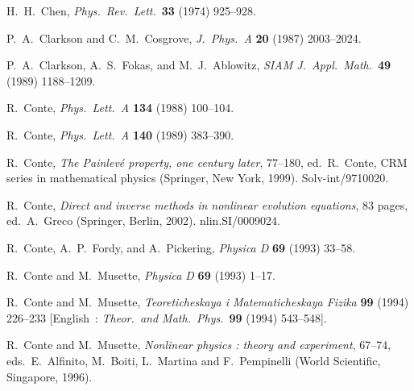 \documentclass[10pt]{article}
\begin{document}
\begin{thebibliography}{99}
 H.~H.~Chen,
{\it Phys.~Rev.~Lett.}~{\bf 33} (1974) 925--928.

 P.~A.~Clarkson and C.~M.~Cosgrove,
{\it J.~Phys.~A} {\bf 20} (1987) 2003--2024.

 P.~A.~Clarkson, A.~S.~Fokas, and M.~J.~Ablowitz,
{\it SIAM J.~Appl.~Math.}~{\bf 49} (1989) 1188--1209.

 R.~Conte,
{\it Phys.~Lett.~A} {\bf 134} (1988) 100--104.

 R.~Conte,
{\it Phys.~Lett.~A} {\bf 140} (1989) 383--390.

 R.~Conte,
{\it The Painlev\'e property, one century later},
77--180,
ed.~R.~Conte,
CRM series in mathematical physics (Springer, New York, 1999).
Solv-int/9710020.

 R.~Conte,
\textit{Direct and inverse methods in nonlinear evolution equations},
83 pages,
ed.~A.~Greco (Springer, Berlin, 2002).
nlin.SI/0009024.

 R.~Conte, A.~P.~Fordy, and A.~Pickering,
{\it Physica D} {\bf 69} (1993) 33--58.

 R.~Conte and M.~Musette,
{\it Physica D} {\bf 69} (1993) 1--17.

 R.~Conte and M.~Musette,
{\it Teoreticheskaya i Matematicheskaya Fizika} {\bf 99} (1994) 226--233
        [English~: {\it Theor.~and Math.~Phys.}~{\bf 99} (1994) 543--548].

 R.~Conte and M.~Musette,
\textit{Nonlinear physics : theory and experiment},
67--74,
eds.~E.~Alfinito, M.~Boiti, L.~Martina and F.~Pempinelli
(World Scientific, Singapore, 1996).


\end{thebibliography}
\end{document}
